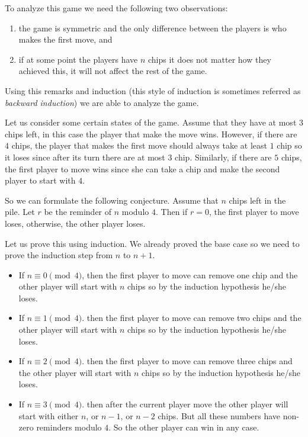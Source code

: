 To analyze this game we need the following two observations:
\begin{enumerate}
  \item the game is symmetric and the only difference between the players is
    who makes the first move, and
  \item if at some point the players have $n$ chips it does not matter how they
    achieved this, it will not affect the rest of the game.
\end{enumerate}
Using this remarks and induction (this style of induction is sometimes
referred as \emph{backward induction}) we are able to analyze the game.

Let us consider some certain states of the game.
Assume that they have at most $3$ chips left, in this case the player that make
the move wins. However, if there are $4$ chips, the
player that makes the first move should always take at least $1$ chip so it
loses since after its turn there are at most $3$ chip. Similarly, if there
are $5$ chips, the first player to move wins since she can take a chip and
make the second player to start with $4$.

So we can formulate the following conjecture.
Assume that $n$ chips left in the pile. Let $r$ be the reminder of $n$ modulo
$4$. Then if $r = 0$, the first player to move loses, otherwise, the other
player loses.

Let us prove this using induction. We already proved the base case so
we need to prove the induction step from $n$ to $n + 1$.
\begin{itemize}
  \item If $n \equiv 0 \pmod{4}$, then the first player to move can remove one
    chip and the other player will start with $n$ chips so by the induction
    hypothesis he/she loses.
  \item If $n \equiv 1 \pmod{4}$. then the first player to move can remove two
    chips and the other player will start with $n$ chips so by the induction
    hypothesis he/she loses.
  \item If $n \equiv 2 \pmod{4}$. then the first player to move can remove three
    chips and the other player will start with $n$ chips so by the induction
    hypothesis he/she loses.
  \item If $n \equiv 3 \pmod{4}$. then after the current player move the other
    player will start with either $n$, or $n - 1$, or $n - 2$ chips. But all
    these numbers have non-zero reminders modulo $4$. So the other player
    can win in any case.
\end{itemize}

